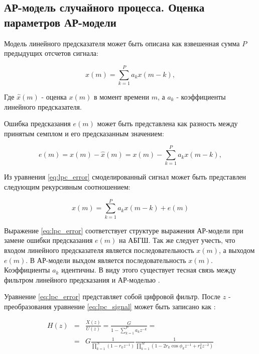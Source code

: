 \subsection{АР-модель случайного процесса. Оценка параметров АР-модели}

Модель линейного предсказателя может быть описана как взвешенная сумма ${P}$ предыдущих отсчетов сигнала:
\begin{center}
\begin{equation}
	\label{eq:lpc_forecast}
	\hat{x}(m) = \sum \limits_{k=1}^P a_k x(m-k),
\end{equation}
\end{center}
Где ${\hat{x}(m)}$ - оценка ${x(m)}$ в момент времени ${m}$, а ${a_k}$ - коэффициенты линейного предсказателя.

Ошибка предсказания ${e(m)}$ может быть представлена как разность между принятым семплом и его
предсказанным значением:
\begin{center}
\begin{equation}
	\label{eq:lpc_error}
	e(m) = x(m) - \hat{x}(m) = x(m) - \sum \limits_{k=1}^P a_k x(m-k),
\end{equation}
\end{center}

Из уравнения \ref{eq:lpc_error} смоделированный сигнал может быть представлен следующим рекурсивным соотношением:
\begin{center}
\begin{equation}
	\label{eq:lpc_signal}
	x(m) = \sum \limits_{k=1}^P a_k x(m-k) + e(m)
\end{equation}
\end{center}

Выражение \ref{eq:lpc_error} соответствует структуре выражения АР-модели при замене ошибки предсказания ${e(m)}$ на АБГШ.
Так же следует учесть, что входом линейного предсказателя является последовательность ${x(m)}$, а выходом ${e(m)}$.
В АР-модели выхдом является последовательность ${x(m)}$. Коэффициенты ${a_k}$ идентичны.
В виду этого существует тесная связь между фильтром линейного предсказания и АР-моделью \cite{marpl_book}.

Уравнение \ref{eq:lpc_error} представляет собой цифровой фильтр.
После ${z}$ - преобразования уравнение \ref{eq:lpc_signal} может быть записано как \cite{saeed_book}:
\begin{center}
\begin{eqnarray}
	\label{eq:lpc_z}
		H(z)	& = & \frac{X(z)}{U(z)} = \frac{G}{1 - \sum \limits_{k=1}^P a_kz^{-k}} =  \nonumber \\
			& = & G\frac{1}{\prod \limits_{k=1}^N (1-r_kz^{-1})} \frac{1}{\prod \limits_{k=1}^M (1-2r_k \cos \phi_k z^{-1} + r_k^2z^{-2})}
\end{eqnarray}
\end{center}


